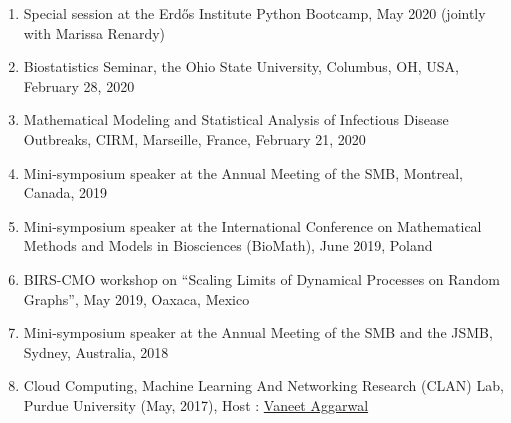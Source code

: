 \documentclass[11pt,a4paper,sans]{moderncv}        %
\begin{document}
\begin{enumerate}
	\item {Special session at the Erd\H{o}s Institute Python Bootcamp, May 2020 (jointly with Marissa Renardy)}
	\item {Biostatistics Seminar, the Ohio State University, Columbus, OH, USA, February 28, 2020}
	\item {Mathematical Modeling and Statistical Analysis of Infectious Disease Outbreaks, CIRM, Marseille, France, February 21, 2020}
	\item {Mini-symposium speaker at the Annual Meeting of the SMB, Montreal, Canada, 2019}
	\item {Mini-symposium speaker at the International Conference on Mathematical Methods and Models in Biosciences (BioMath), June 2019, Poland}
	\item {BIRS-CMO workshop on ``Scaling Limits of Dynamical Processes on Random Graphs'', May 2019, Oaxaca, Mexico}
	\item {Mini-symposium speaker at the Annual Meeting of the SMB and the JSMB, Sydney, Australia, 2018}
	\item {Cloud Computing, Machine Learning And Networking Research (CLAN) Lab, Purdue University (May, 2017), Host : \href{http://web.ics.purdue.edu/~vaneet/}{Vaneet Aggarwal} }
\end{enumerate}



\end{document}
